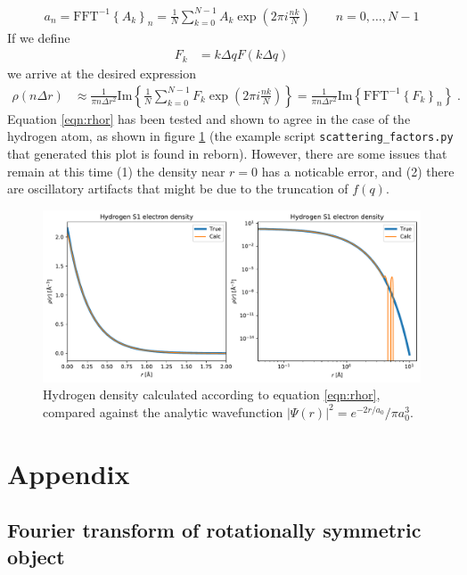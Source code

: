 \documentclass[11pt]{article}
\begin{document}
\begin{align}\label{eqn:idft}
a_n = \text{FFT}^{-1}\left\{ A_k \right\}_n = \frac{1}{N}\sum_{k=0}^{N-1}A_k\exp\left(2\pi i \frac{nk}{N}\right)
\qquad n = 0,\ldots,N-1
\end{align}
If we define
\begin{align}
F_k &= k \Delta q F(k \Delta q) 
\end{align}
we arrive at the desired expression
\begin{align}\label{eqn:rhor}
\rho(n \Delta r) &\approx \frac{1}{\pi n \Delta r^2 } \text{Im} \left\{ \frac{1}{N}  \sum_{k=0}^{N-1}    F_k
\exp\left( 2\pi i \frac{nk}{ N} \right) \right\} = \frac{1}{\pi n \Delta r^2 } \text{Im}\left\{ \text{FFT}^{-1}
\left\{ F_k \right\}_n\right\} \; .
\end{align}
Equation \ref{eqn:rhor} has been tested and shown to agree in the case of the hydrogen atom, as shown in figure
\ref{fig:hydrogen} (the example script \texttt{scattering\_factors.py} that generated this plot is found in reborn).
However, there are some issues that remain at this time (1) the density near $r=0$ has a noticable error, and (2) there
are oscillatory artifacts that might be due to the truncation of $f(q)$.

\begin{figure}[htbp]
   \centering
   \includegraphics[width=\textwidth]{figures/hydrogen_density_1.pdf} 
   \caption{Hydrogen density calculated according to equation \ref{eqn:rhor}, compared against the analytic wavefunction
       $|\Psi(r)|^2=e^{-2 r/a_0}/\pi a_0^3$.}
   \label{fig:hydrogen}
\end{figure}

\newpage

\section{Appendix}

\subsection{Fourier transform of rotationally symmetric object}
\label{sec:3d1d}
\end{document}
